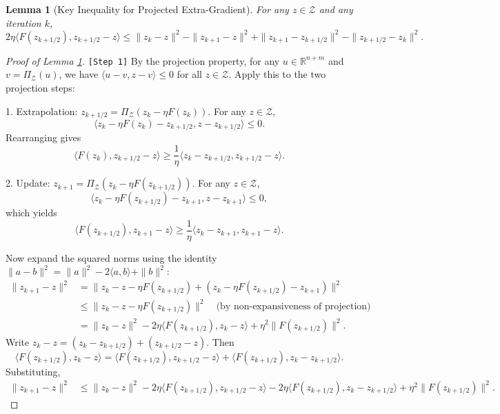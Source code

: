\documentclass{article}
\theoremstyle{plain}
\newtheorem{lemma}{Lemma}
\theoremstyle{definition}
\begin{document}
\begin{lemma}[Key Inequality for Projected Extra-Gradient] \label{lem:key_ineq}
For any $z \in \mathcal{Z}$ and any iteration $k$,
\begin{equation} \label{eq:key_ineq}
2\eta \langle F(z_{k+1/2}), z_{k+1/2} - z \rangle \le \|z_k - z\|^2 - \|z_{k+1} - z\|^2 + \|z_{k+1} - z_{k+1/2}\|^2 - \|z_{k+1/2} - z_k\|^2.
\end{equation}
\end{lemma}
\begin{proof}[Proof of Lemma \ref{lem:key_ineq}] \texttt{[Step 1]}
By the projection property, for any $u \in \mathbb{R}^{n+m}$ and $v = \Pi_{\mathcal{Z}}(u)$, we have $\langle u - v, z - v \rangle \le 0$ for all $z \in \mathcal{Z}$. Apply this to the two projection steps:

1. Extrapolation: $z_{k+1/2} = \Pi_{\mathcal{Z}}(z_k - \eta F(z_k))$. For any $z \in \mathcal{Z}$,
\[
\langle z_k - \eta F(z_k) - z_{k+1/2}, z - z_{k+1/2} \rangle \le 0.
\]
Rearranging gives
\[
\langle F(z_k), z_{k+1/2} - z \rangle \ge \frac{1}{\eta} \langle z_k - z_{k+1/2}, z_{k+1/2} - z \rangle. \tag{1}
\]

2. Update: $z_{k+1} = \Pi_{\mathcal{Z}}(z_k - \eta F(z_{k+1/2}))$. For any $z \in \mathcal{Z}$,
\[
\langle z_k - \eta F(z_{k+1/2}) - z_{k+1}, z - z_{k+1} \rangle \le 0,
\]
which yields
\[
\langle F(z_{k+1/2}), z_{k+1} - z \rangle \ge \frac{1}{\eta} \langle z_k - z_{k+1}, z_{k+1} - z \rangle. \tag{2}
\]

Now expand the squared norms using the identity $\|a-b\|^2 = \|a\|^2 - 2\langle a,b\rangle + \|b\|^2$:
\begin{align*}
\|z_{k+1} - z\|^2 &= \|z_k - z - \eta F(z_{k+1/2}) + (z_k - \eta F(z_{k+1/2}) - z_{k+1})\|^2 \\
&\le \|z_k - z - \eta F(z_{k+1/2})\|^2 \quad \text{(by non-expansiveness of projection)} \\
&= \|z_k - z\|^2 - 2\eta \langle F(z_{k+1/2}), z_k - z \rangle + \eta^2 \|F(z_{k+1/2})\|^2.
\end{align*}
Write $z_k - z = (z_k - z_{k+1/2}) + (z_{k+1/2} - z)$. Then
\[
\langle F(z_{k+1/2}), z_k - z \rangle = \langle F(z_{k+1/2}), z_{k+1/2} - z \rangle + \langle F(z_{k+1/2}), z_k - z_{k+1/2} \rangle.
\]
Substituting,
\begin{align*}
\|z_{k+1} - z\|^2 &\le \|z_k - z\|^2 - 2\eta \langle F(z_{k+1/2}), z_{k+1/2} - z \rangle - 2\eta \langle F(z_{k+1/2}), z_k - z_{k+1/2} \rangle + \eta^2 \|F(z_{k+1/2})\|^2. \tag{3}
\end{align*}


\end{proof}
\end{document}
